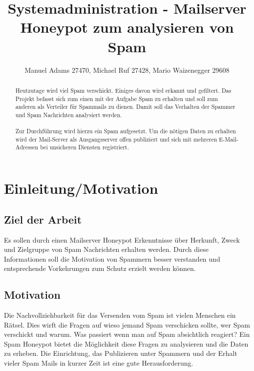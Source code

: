 \documentclass[a4paper,11pt,singlespacing]{article}
\begin{document}

\title{Systemadministration - Mailserver Honeypot zum analysieren von Spam}
\author{Manuel Adams 27470, Michael Ruf 27428, Mario Waizenegger 29608}
\maketitle
\begin{abstract}
Heutzutage wird viel Spam verschickt. Einiges davon wird erkannt und gefiltert.
Das Projekt befasst sich zum einen mit der Aufgabe Spam zu erhalten und soll zum anderen als Verteiler für Spammails zu dienen.
Damit soll das Verhalten der Spammer und Spam Nachrichten analysiert werden.
\\\\
Zur Durchführung wird hierzu ein Spam  aufgesetzt.
Um die nötigen Daten zu erhalten wird der Mail-Server als Ausgangsserver offen publiziert und sich mit mehreren E-Mail-Adressen bei unsicheren Diensten registriert.
\end{abstract}

\newpage

\tableofcontents

\newpage
{}

\section{Einleitung/Motivation}\label{sec:Einleitung}

	\subsection{Ziel der Arbeit}\label{sec:EinleitungZiel}
		Es sollen durch einen Mailserver Honeypot Erkenntnisse über Herkunft, Zweck und Zielgruppe von Spam Nachrichten erhalten werden.
		Durch diese Informationen soll die Motivation von Spammern besser verstanden und entsprechende Vorkehrungen zum Schutz erzielt werden können.

	\subsection{Motivation}\label{sec:EinleitungMotivation}
		Die Nachvollziehbarkeit für das Versenden vom Spam ist vielen Menschen ein Rätsel.
		Dies wirft die Fragen auf wieso jemand Spam verschicken sollte, wer Spam verschickt und warum.
		Was passiert wenn man auf Spam absichtlich reagiert?
		Ein Spam Honeypot bietet die Möglichkeit diese Fragen zu analysieren und die Daten zu erheben.
		Die Einrichtung, das Publizieren unter Spammern und der Erhalt vieler Spam Mails in kurzer Zeit ist eine gute Herausforderung.
	
\end{document}
